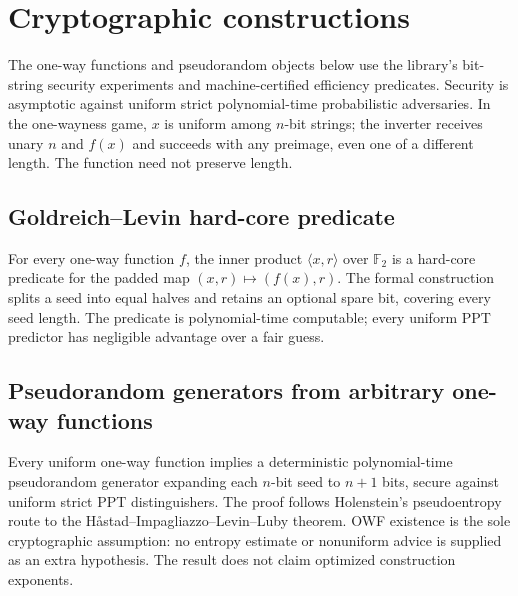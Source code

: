 \section{Cryptographic constructions}

The one-way functions and pseudorandom objects below use the library's bit-string
security experiments and machine-certified efficiency predicates. Security is
asymptotic against uniform strict polynomial-time probabilistic adversaries.
In the one-wayness game, $x$ is uniform among $n$-bit strings; the inverter receives
unary $n$ and $f(x)$ and succeeds with any preimage, even one of a different length.
The function need not preserve length.

\begin{result}
\subsection{Goldreich--Levin hard-core predicate}
For every one-way function $f$, the inner product $\langle x,r\rangle$ over
$\mathbb F_2$ is a hard-core predicate for the padded map $(x,r)\mapsto(f(x),r)$.
The formal construction splits a seed into equal halves and retains an optional
spare bit, covering every seed length. The predicate is polynomial-time computable;
every uniform PPT predictor has negligible advantage over a fair guess.
\citep{GoldreichLevin1989}
\end{result}

\begin{result}
\subsection{Pseudorandom generators from arbitrary one-way functions}
Every uniform one-way function implies a deterministic polynomial-time
pseudorandom generator expanding each $n$-bit seed to $n+1$ bits, secure against
uniform strict PPT distinguishers. The proof follows Holenstein's
pseudoentropy route to the H\aa stad--Impagliazzo--Levin--Luby theorem.
OWF existence is the sole cryptographic assumption: no entropy estimate or
nonuniform advice is supplied as an extra hypothesis. The result does not claim
optimized construction exponents.\citep{HILL1999,Holenstein2006}
\end{result}

